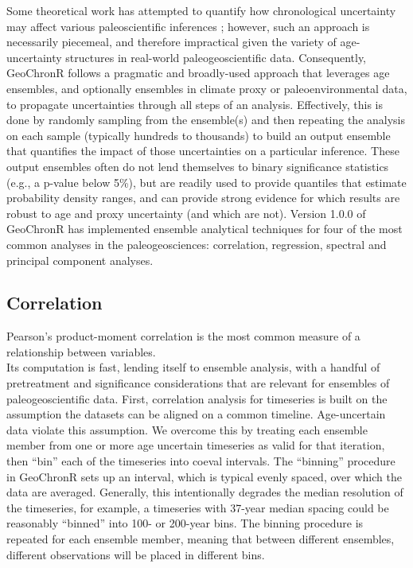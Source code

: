 \documentclass[gchron, manuscript]{copernicus}
\begin{document}
Some theoretical work has attempted to quantify how chronological uncertainty may affect various paleoscientific inferences \citep[e.g.][]{HuybersWunsch2004}; however, such an approach is necessarily piecemeal, and therefore impractical given the variety of age-uncertainty structures in real-world paleogeoscientific data.
Consequently, GeoChronR follows a pragmatic and broadly-used approach that leverages age ensembles, and optionally ensembles in climate proxy or paleoenvironmental data, to propagate uncertainties through all steps of an analysis.
Effectively, this is done by randomly sampling from the ensemble(s) and then repeating the analysis on each sample (typically hundreds to thousands) to build an output ensemble that quantifies the impact of those uncertainties on a particular inference.
These output ensembles often do not lend themselves to binary significance statistics (e.g., a p-value below 5\%), but are readily used to provide quantiles that estimate probability density ranges, and can provide strong evidence for which results are robust to age and proxy uncertainty (and which are not).
Version 1.0.0 of GeoChronR has implemented ensemble analytical techniques for four of the most common analyses in the paleogeosciences: correlation, regression, spectral and principal component analyses.

\subsection{Correlation}

Pearson's product-moment correlation is the most common measure of a relationship between variables.\\
Its computation is fast, lending itself to ensemble analysis, with a handful of pretreatment and significance considerations that are relevant for ensembles of paleogeoscientific data.
First, correlation analysis for timeseries is built on the assumption the datasets can be aligned on a common timeline.
Age-uncertain data violate this assumption.
We overcome this by treating each ensemble member from one or more age uncertain timeseries as valid for that iteration, then ``bin'' each of the timeseries into coeval intervals.
The ``binning'' procedure in GeoChronR sets up an interval, which is typical evenly spaced, over which the data are averaged.
Generally, this intentionally degrades the median resolution of the timeseries, for example, a timeseries with 37-year median spacing could be reasonably ``binned'' into 100- or 200-year bins.
The binning procedure is repeated for each ensemble member, meaning that between different ensembles, different observations will be placed in different bins.
\end{document}
